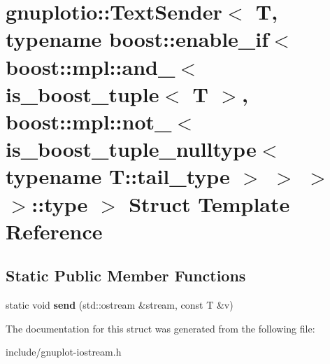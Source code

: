 \hypertarget{structgnuplotio_1_1TextSender_3_01T_00_01typename_01boost_1_1enable__if_3_01boost_1_1mpl_1_1and_613e8c35e9263a9c4b5e2b75ff99b434}{}\section{gnuplotio\+:\+:Text\+Sender$<$ T, typename boost\+:\+:enable\+\_\+if$<$ boost\+:\+:mpl\+:\+:and\+\_\+$<$ is\+\_\+boost\+\_\+tuple$<$ T $>$, boost\+:\+:mpl\+:\+:not\+\_\+$<$ is\+\_\+boost\+\_\+tuple\+\_\+nulltype$<$ typename T\+:\+:tail\+\_\+type $>$ $>$ $>$ $>$\+:\+:type $>$ Struct Template Reference}
\label{structgnuplotio_1_1TextSender_3_01T_00_01typename_01boost_1_1enable__if_3_01boost_1_1mpl_1_1and_613e8c35e9263a9c4b5e2b75ff99b434}
\subsection*{Static Public Member Functions}
\begin{DoxyCompactItemize}
\item 
\mbox{\label{structgnuplotio_1_1TextSender_3_01T_00_01typename_01boost_1_1enable__if_3_01boost_1_1mpl_1_1and_613e8c35e9263a9c4b5e2b75ff99b434_a57bf894398f70f08cd4bac18ee5cbf68}} 
static void {\bfseries send} (std\+::ostream \&stream, const T \&v)
\end{DoxyCompactItemize}


The documentation for this struct was generated from the following file\+:\begin{DoxyCompactItemize}
\item 
include/gnuplot-\/iostream.\+h\end{DoxyCompactItemize}
